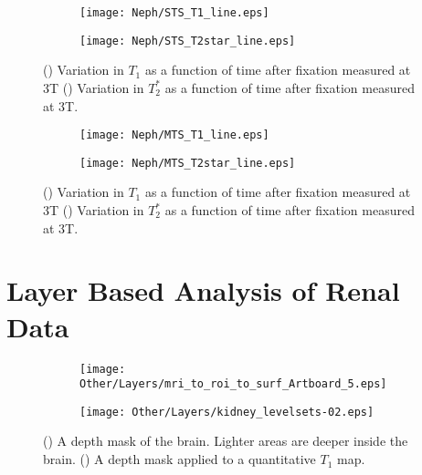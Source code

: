 \begin{figure}[H]
	\centering
	\begin{subfigure}[c]{0.47\textwidth}
		\centering
		\texttt{[image: Neph/STS\_T1\_line.eps]}
		\caption{}
		\label{fig:ex_fixation_t1_3t_sts}
	\end{subfigure}
	\hfill
	\begin{subfigure}[c]{0.47\textwidth}
		\centering
		\texttt{[image: Neph/STS\_T2star\_line.eps]}
		\caption{}
		\label{fig:ex_fixation_t2star_3t_sts}
	\end{subfigure}
	\caption{() Variation in $T_1$ as a function of time after fixation measured at 3T () Variation in $T_2^*$ as a function of time after fixation measured at 3T.}
	\label{fig:ex_fixation_sts}
\end{figure}

\begin{figure}[H]
	\centering
	\begin{subfigure}[c]{0.47\textwidth}
		\centering
		\texttt{[image: Neph/MTS\_T1\_line.eps]}
		\caption{}
		\label{fig:ex_fixation_t1_3t_mts}
	\end{subfigure}
	\hfill
	\begin{subfigure}[c]{0.47\textwidth}
		\centering
		\texttt{[image: Neph/MTS\_T2star\_line.eps]}
		\caption{}
		\label{fig:ex_fixation_t2star_3t_mts}
	\end{subfigure}
	\caption{() Variation in $T_1$ as a function of time after fixation measured at 3T () Variation in $T_2^*$ as a function of time after fixation measured at 3T.}
	\label{fig:ex_fixation_mts}
\end{figure}
\section{Layer Based Analysis of Renal Data}
\begin{figure}[H]
	\centering
	\begin{subfigure}[c]{0.47\textwidth}
		\centering
		\texttt{[image: Other/Layers/mri\_to\_roi\_to\_surf\_Artboard\_5.eps]}
		\caption{}
		\label{fig:ex_layers_brain}
	\end{subfigure}
	\hfill
	\begin{subfigure}[c]{0.47\textwidth}
		\centering
		\texttt{[image: Other/Layers/kidney\_levelsets-02.eps]}
		\caption{}
		\label{fig:ex_layers_kidney}
	\end{subfigure}
	\caption{() A depth mask of the brain. Lighter areas are deeper inside the brain. () A depth mask applied to a quantitative $T_1$ map.}
	\label{fig:ex_layers_example}
\end{figure}

